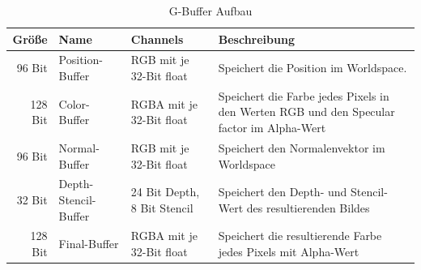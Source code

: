 \begin{table}
	\caption{G-Buffer Aufbau}
	\label{table:GBuffer}
	\centering
	\begin{tabular}{rlll}\toprule[1.5pt]
		Größe & Name & Channels & Beschreibung \\\midrule
		96 Bit  & Position-Buffer & RGB mit je 32-Bit float & Speichert die Position im Worldspace.\\
		128 Bit & Color-Buffer & RGBA mit je 32-Bit float & Speichert die Farbe jedes Pixels in den Werten RGB und den Specular factor im Alpha-Wert \\
		96 Bit & Normal-Buffer & RGB mit je 32-Bit float & Speichert den Normalenvektor im Worldspace \\
		32 Bit & Depth-Stencil-Buffer & 24 Bit Depth, 8 Bit Stencil & Speichert den Depth- und Stencil-Wert des resultierenden Bildes \\
		128 Bit & Final-Buffer & RGBA mit je 32-Bit float & Speichert die resultierende Farbe jedes Pixels mit Alpha-Wert \\\bottomrule[1.5pt]
	\end{tabular}
\end{table}
